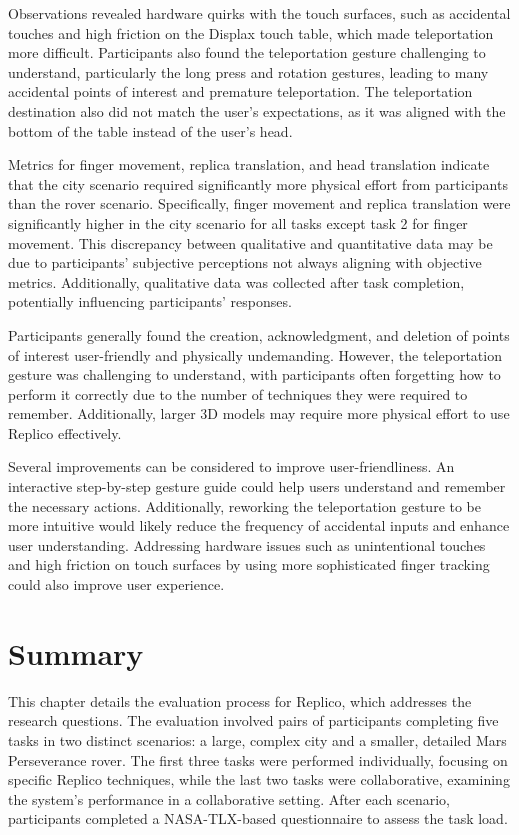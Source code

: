 \begin{description}
            Observations revealed hardware quirks with the touch surfaces, such as accidental touches and high friction on the Displax touch table, which made teleportation more difficult. Participants also found the teleportation gesture challenging to understand, particularly the long press and rotation gestures, leading to many accidental points of interest and premature teleportation. The teleportation destination also did not match the user's expectations, as it was aligned with the bottom of the table instead of the user's head.

            Metrics for finger movement, replica translation, and head translation indicate that the city scenario required significantly more physical effort from participants than the rover scenario. Specifically, finger movement and replica translation were significantly higher in the city scenario for all tasks except task 2 for finger movement. This discrepancy between qualitative and quantitative data may be due to participants' subjective perceptions not always aligning with objective metrics. Additionally, qualitative data was collected after task completion, potentially influencing participants' responses.

            Participants generally found the creation, acknowledgment, and deletion of points of interest user-friendly and physically undemanding. However, the teleportation gesture was challenging to understand, with participants often forgetting how to perform it correctly due to the number of techniques they were required to remember. Additionally, larger 3D models may require more physical effort to use Replico effectively.

            Several improvements can be considered to improve user-friendliness. An interactive step-by-step gesture guide could help users understand and remember the necessary actions. Additionally, reworking the teleportation gesture to be more intuitive would likely reduce the frequency of accidental inputs and enhance user understanding. Addressing hardware issues such as unintentional touches and high friction on touch surfaces by using more sophisticated finger tracking could also improve user experience.
        \end{description}

\section{Summary}

    This chapter details the evaluation process for Replico, which addresses the research questions. The evaluation involved pairs of participants completing five tasks in two distinct scenarios: a large, complex city and a smaller, detailed Mars Perseverance rover. The first three tasks were performed individually, focusing on specific Replico techniques, while the last two tasks were collaborative, examining the system's performance in a collaborative setting. After each scenario, participants completed a NASA-TLX-based questionnaire to assess the task load.

